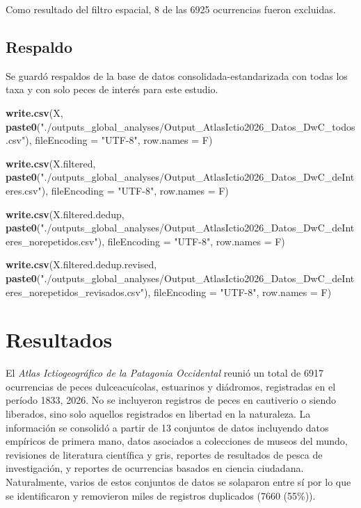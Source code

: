\documentclass[sn-apa,pdflatex]{sn-jnl}
\newenvironment{Shaded}{\begin{snugshade}}{\end{snugshade}}
\newcommand{\AttributeTok}[1]{\textcolor[rgb]{0.13,0.29,0.53}{#1}}
\newcommand{\FunctionTok}[1]{\textcolor[rgb]{0.13,0.29,0.53}{\textbf{#1}}}
\newcommand{\NormalTok}[1]{#1}
\newcommand{\StringTok}[1]{\textcolor[rgb]{0.31,0.60,0.02}{#1}}
\begin{document}
Como resultado del filtro espacial, 8 de las 6925 ocurrencias fueron
excluidas.

\subsection{Respaldo}\label{respaldo-12}

Se guardó respaldos de la base de datos consolidada-estandarizada con
todas los taxa y con solo peces de interés para este estudio.

\begin{Shaded}
\begin{Highlighting}[]
\FunctionTok{write.csv}\NormalTok{(X, }\FunctionTok{paste0}\NormalTok{(}\StringTok{"./outputs\_global\_analyses/Output\_AtlasIctio2026\_Datos\_DwC\_todos.csv"}\NormalTok{),}
    \AttributeTok{fileEncoding =} \StringTok{"UTF{-}8"}\NormalTok{, }\AttributeTok{row.names =}\NormalTok{ F)}

\FunctionTok{write.csv}\NormalTok{(X.filtered, }\FunctionTok{paste0}\NormalTok{(}\StringTok{"./outputs\_global\_analyses/Output\_AtlasIctio2026\_Datos\_DwC\_deInteres.csv"}\NormalTok{),}
    \AttributeTok{fileEncoding =} \StringTok{"UTF{-}8"}\NormalTok{, }\AttributeTok{row.names =}\NormalTok{ F)}

\FunctionTok{write.csv}\NormalTok{(X.filtered.dedup, }\FunctionTok{paste0}\NormalTok{(}\StringTok{"./outputs\_global\_analyses/Output\_AtlasIctio2026\_Datos\_DwC\_deInteres\_norepetidos.csv"}\NormalTok{),}
    \AttributeTok{fileEncoding =} \StringTok{"UTF{-}8"}\NormalTok{, }\AttributeTok{row.names =}\NormalTok{ F)}

\FunctionTok{write.csv}\NormalTok{(X.filtered.dedup.revised, }\FunctionTok{paste0}\NormalTok{(}\StringTok{"./outputs\_global\_analyses/Output\_AtlasIctio2026\_Datos\_DwC\_deInteres\_norepetidos\_revisados.csv"}\NormalTok{),}
    \AttributeTok{fileEncoding =} \StringTok{"UTF{-}8"}\NormalTok{, }\AttributeTok{row.names =}\NormalTok{ F)}
\end{Highlighting}
\end{Shaded}

\section{Resultados}\label{resultados}

El \emph{Atlas Ictiogeográfico de la Patagonia Occidental} reunió un
total de 6917 ocurrencias de peces dulceacuícolas, estuarinos y
diádromos, registradas en el período 1833, 2026. No se incluyeron
registros de peces en cautiverio o siendo liberados, sino solo aquellos
registrados en libertad en la naturaleza. La información se consolidó a
partir de 13 conjuntos de datos incluyendo datos empíricos de primera
mano, datos asociados a colecciones de museos del mundo, revisiones de
literatura científica y gris, reportes de resultados de pesca de
investigación, y reportes de ocurrencias basados en ciencia ciudadana.
Naturalmente, varios de estos conjuntos de datos se solaparon entre sí
por lo que se identificaron y removieron miles de registros duplicados
(7660 (55\%)).
\end{document}
